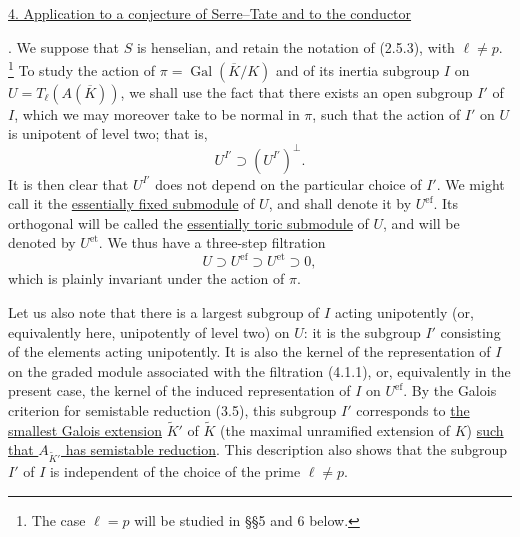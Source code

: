 
\medskip
\noindent
\underline{4. Application to a conjecture of Serre--Tate and to the
conductor}

\medskip
{}. We suppose that $S$ is henselian, and retain the notation of (2.5.3),
with $\ell\ne p$.
\footnote{The case $\ell=p$ will be studied in \S\S5 and 6 below.}
To study the action of $\pi=\operatorname{Gal}(\overline K/K)$ and of its
inertia subgroup $I$ on $U=T_\ell(A(\overline K))$, we shall use the fact
that there exists an open subgroup $I'$ of $I$, which we may moreover take
to be normal in $\pi$, such that the action of $I'$ on $U$ is unipotent of
level two; that is,
\[
 U^{I'}\supset (U^{I'})^\perp.
\]
It is then clear that $U^{I'}$ does not depend on the particular choice of
$I'$.  We might call it the \underline{essentially fixed submodule} of
$U$, and shall denote it by $U^{\mathrm{ef}}$.  Its orthogonal will be
called the \underline{essentially toric submodule} of $U$, and will be
denoted by $U^{\mathrm{et}}$.  We thus have a three-step filtration
\begin{equation}\tag{4.1.1}
 U\supset U^{\mathrm{ef}}\supset U^{\mathrm{et}}\supset0,
\end{equation}
which is plainly invariant under the action of $\pi$.

Let us also note that there is a largest subgroup of $I$ acting
unipotently (or, equivalently here, unipotently of level two) on $U$: it
is the subgroup $I'$ consisting of the elements acting unipotently.  It is
also the kernel of the representation of $I$ on the graded module
associated with the filtration (4.1.1), or, equivalently in the present
case, the kernel of the induced representation of $I$ on
$U^{\mathrm{ef}}$.  By the Galois criterion for semistable reduction
(3.5), this subgroup $I'$ corresponds to \underline{the smallest Galois
extension} $\widetilde K'$ of $\widetilde K$ (the maximal unramified
extension of $K$) \underline{such that $A_{\widetilde K'}$ has
semistable reduction}.  This description also shows that the subgroup
$I'$ of $I$ is independent of the choice of the prime $\ell\ne p$.

